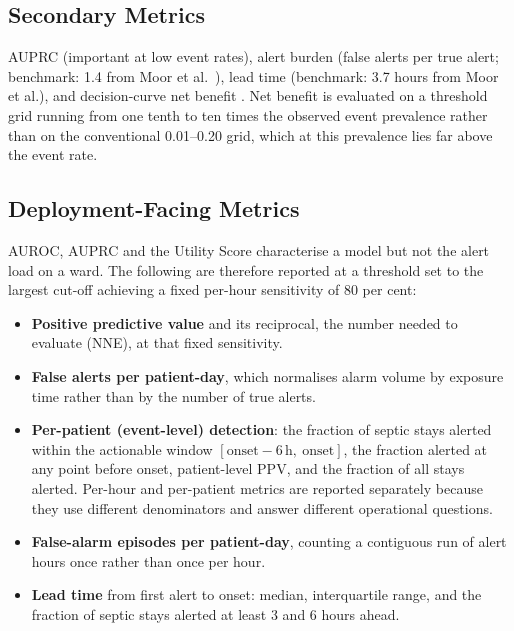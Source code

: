 \subsection{Secondary Metrics}

AUPRC (important at low event rates), alert burden (false alerts per true alert;
benchmark: 1.4 from Moor et al.\ \cite{moor2023review}), lead time
(benchmark: 3.7 hours from Moor et al.), and decision-curve net benefit
\cite{vickers2006dca}. Net benefit is evaluated on a threshold grid running
from one tenth to ten times the observed event prevalence rather than on the
conventional 0.01--0.20 grid, which at this prevalence lies far above the
event rate.

\subsection{Deployment-Facing Metrics}
\label{sec:deployment_metrics}

AUROC, AUPRC and the Utility Score characterise a model but not the alert load
on a ward. The following are therefore reported at a threshold set to the
largest cut-off achieving a fixed per-hour sensitivity of 80 per cent:

\begin{itemize}
    \item \textbf{Positive predictive value} and its reciprocal, the number
    needed to evaluate (NNE), at that fixed sensitivity.
    \item \textbf{False alerts per patient-day}, which normalises alarm volume
    by exposure time rather than by the number of true alerts.
    \item \textbf{Per-patient (event-level) detection}: the fraction of septic
    stays alerted within the actionable window
    $[\text{onset}-6\,\text{h},\ \text{onset}]$, the fraction alerted at any
    point before onset, patient-level PPV, and the fraction of all stays
    alerted. Per-hour and per-patient metrics are reported separately because
    they use different denominators and answer different operational
    questions.
    \item \textbf{False-alarm episodes per patient-day}, counting a contiguous
    run of alert hours once rather than once per hour.
    \item \textbf{Lead time} from first alert to onset: median, interquartile
    range, and the fraction of septic stays alerted at least 3 and 6 hours
    ahead.
\end{itemize}

